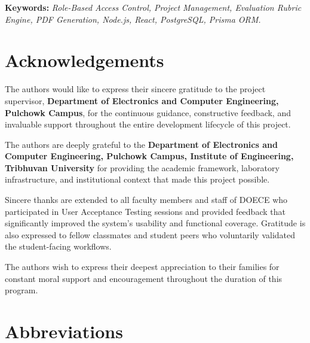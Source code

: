 \documentclass[12pt,a4paper]{report}
\begin{document}
\noindent\textbf{Keywords:} \textit{Role-Based Access Control, Project Management, Evaluation Rubric Engine, PDF Generation, Node.js, React, PostgreSQL, Prisma ORM.}

\chapter*{Acknowledgements}

The authors would like to express their sincere gratitude to the project supervisor, \textbf{Department of Electronics and Computer Engineering, Pulchowk Campus}, for the continuous guidance, constructive feedback, and invaluable support throughout the entire development lifecycle of this project.

The authors are deeply grateful to the \textbf{Department of Electronics and Computer Engineering, Pulchowk Campus, Institute of Engineering, Tribhuvan University} for providing the academic framework, laboratory infrastructure, and institutional context that made this project possible.

Sincere thanks are extended to all faculty members and staff of DOECE who participated in User Acceptance Testing sessions and provided feedback that significantly improved the system's usability and functional coverage. Gratitude is also expressed to fellow classmates and student peers who voluntarily validated the student-facing workflows.

The authors wish to express their deepest appreciation to their families for constant moral support and encouragement throughout the duration of this program.

\tableofcontents
\listoffigures
{}
\listoftables
{}

\chapter*{Abbreviations}
\end{document}
